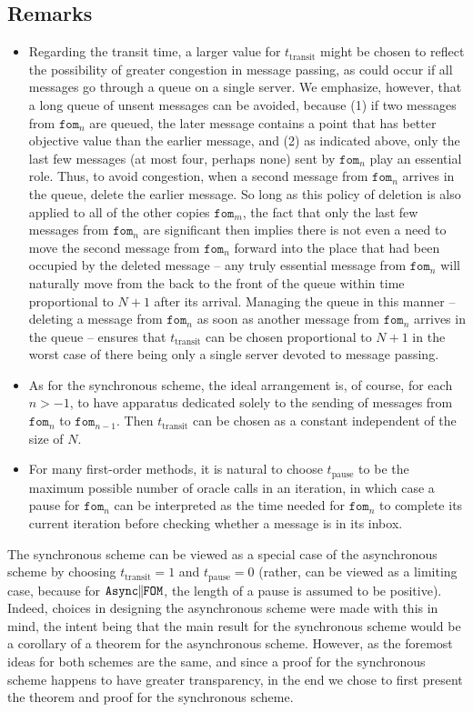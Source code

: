 \documentclass[reqno, 11pt]{amsart}
\numberwithin{equation}{section}
\newcommand{\nt}{\negthinspace}
\newcommand{\fom}{\mathtt{fom}}
\newcommand{\parfom}{\parallel \nt \nt  \mathtt{FOM}}
\newcommand{\tpause}{t_{\mathrm{pause}}}
\newcommand{\ttransit}{t_{\mathrm{transit}}}
\newcommand{\aparfom}{\mathtt{Async} \nt \nt \parfom}
\begin{document}
\subsection{Remarks} \label{sect.gb} 
\begin{itemize}

\item  Regarding the transit time, a larger value for $ \ttransit $ might be chosen to reflect the possibility of greater congestion in message passing, as could occur if all messages go through a queue on a single server. We emphasize, however, that a long queue of unsent messages can be avoided, because (1) if two messages from $ \fom_n $ are queued, the later message contains a point that has better objective value than the earlier message, and (2) as indicated above, only the last few messages (at most four, perhaps none) sent by $ \fom_n $ play an essential role.  Thus, to avoid congestion, when a second message from $ \fom_n $ arrives in the queue, delete the earlier message. So long as this policy of deletion is also applied to all of the other copies $ \fom_m $, the fact that only the last few messages from $ \fom_n $ are significant then implies there is not even a need to move the second message from $ \fom_n $ forward into the place that had been occupied by the deleted message -- any truly essential message from $ \fom_n $ will naturally move from the back to the front of the queue within time proportional to $ N+1 $ after its arrival.  Managing the queue in this manner -- deleting a message from $ \fom_n $ as soon as another message from $ \fom_n $ arrives in the queue -- ensures that $ \ttransit $ can be chosen proportional to $ N+1 $ in the worst case of there being only a single server devoted to message passing.
\item  As for the synchronous scheme, the ideal arrangement is, of course, for each $ n > -1 $, to have apparatus dedicated solely to the sending of messages from $ \fom_n $ to $ \fom_{n-1} $. Then $ \ttransit $ can be chosen as a constant independent of the size of $ N $.
\item For many first-order methods, it is natural to choose $ \tpause $ to be the maximum possible number of oracle calls in an iteration, in which case a pause for $ \fom_n $ can be interpreted as the time needed for $ \fom_n $ to complete its current iteration before checking whether a message is in its inbox. 
\end{itemize}
 

The synchronous scheme can be viewed as a special case of the asynchronous scheme by choosing $ \ttransit = 1 $ and $ \tpause = 0 $ (rather, can be viewed as a limiting case, because for $ \aparfom $, the length of a pause is assumed to be positive).   Indeed, choices in designing the asynchronous scheme were made with this in mind, the intent being that the main result for the synchronous scheme would be a corollary of a theorem for the asynchronous scheme.  However, as the foremost ideas for both schemes are the same, and since a proof for the synchronous scheme happens to have greater transparency, in the end we chose to first present the theorem and proof for the synchronous scheme.
\end{document}

